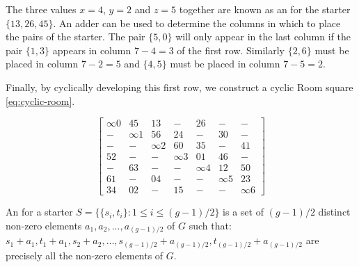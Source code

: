 The three values $x = 4$, $y = 2$ and $z = 5$ together are known as an  for the starter $\{13, 26, 45\}$.
An adder can be used to determine the columns in which to place the pairs of the starter.
The pair $\{5, 0\}$ will only appear in the last column if the pair $\{1, 3\}$ appears in column $7 - 4 = 3$ of the first row.
Similarly $\{2, 6\}$ must be placed in column $7 - 2 = 5$ and $\{4, 5\}$ must be placed in column $7 - 5 = 2$.

Finally, by cyclically developing this first row, we construct a cyclic Room square \eqref{eq:cyclic-room}.

\begin{equation}
  \begin{bmatrix}
    \infty 0 &  45 &  13 &   - &  26 &   - &   - \\
     - &  \infty 1 &  56 &  24 &   - &  30 &   - \\
     - &   - &  \infty 2 &  60 &  35 &   - &  41 \\
    52 &   - &   - &  \infty 3 &  01 &  46 &   - \\
     - &  63 &   - &   - &  \infty 4 &  12 &  50 \\
    61 &   - &  04 &   - &   - &  \infty 5 &  23 \\
    34 &  02 &   - &  15 &   - &   - &  \infty 6 
  \end{bmatrix}
  \label{eq:cyclic-room}
\end{equation}

An  for a starter
$S = \{\{s_i, t_i\}: 1 \leq i \leq (g - 1)/2 \}$
is a set of $(g - 1)/2$ distinct non-zero elements
$a_1, a_2, ..., a_{(g - 1)/2}$ of $G$ such that:
$s_1 + a_1, t_1 + a_1, s_2 + a_2, \ldots, s_{(g - 1)/2} + a_{(g - 1)/2}, t_{(g - 1)/2} + a_{(g - 1)/2}$
are precisely all the non-zero elements of $G$.

